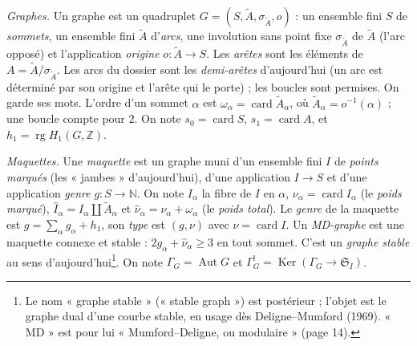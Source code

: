 \documentclass[11pt,a4paper]{article}
\begin{document}
\emph{Graphes.} Un graphe est un quadruplet $G = (S, \widetilde{A},
\sigma_{\widetilde{A}}, o)$ : un ensemble fini $S$ de \emph{sommets}, un ensemble
fini $\widetilde{A}$ d'\emph{arcs}, une involution sans point fixe
$\sigma_{\widetilde{A}}$ de $\widetilde{A}$ (l'arc opposé) et l'application
\emph{origine} $o : \widetilde{A} \to S$. Les \emph{arêtes} sont les éléments de
$A = \widetilde{A}/\sigma_{\widetilde{A}}$. Les arcs du dossier sont les
\emph{demi-arêtes} d'aujourd'hui (un arc est déterminé par son origine et
l'arête qui le porte) ; les boucles sont permises. On garde ses mots. L'ordre
d'un sommet $\alpha$ est $\omega_\alpha = \operatorname{card}
\widetilde{A}_\alpha$, où $\widetilde{A}_\alpha = o^{-1}(\alpha)$ ; une boucle
compte pour $2$. On note $s_0 = \operatorname{card} S$, $s_1 =
\operatorname{card} A$, et $h_1 = \operatorname{rg} H_1(G, \mathbb{Z})$.

\emph{Maquettes.} Une \emph{maquette} est un graphe muni d'un ensemble fini $I$ de
\emph{points marqués} (les « jambes » d'aujourd'hui), d'une application $I \to S$
et d'une application \emph{genre} $g : S \to \mathbb{N}$. On note $I_\alpha$ la
fibre de $I$ en $\alpha$, $\nu_\alpha = \operatorname{card} I_\alpha$ (le
\emph{poids marqué}), $\widehat{I}_\alpha = I_\alpha \amalg
\widetilde{A}_\alpha$ et $\widehat{\nu}_\alpha = \nu_\alpha + \omega_\alpha$ (le
\emph{poids total}). Le \emph{genre} de la maquette est $g = \sum_\alpha g_\alpha
+ h_1$, son \emph{type} est $(g, \nu)$ avec $\nu = \operatorname{card} I$. Un
\emph{MD-graphe} est une maquette connexe et stable : $2g_\alpha +
\widehat{\nu}_\alpha \geq 3$ en tout sommet. C'est un \emph{graphe stable} au
sens d'aujourd'hui\footnote{Le nom « graphe stable » (« stable graph ») est
postérieur ; l'objet est le graphe dual d'une courbe stable, en usage dès
Deligne--Mumford (1969). « MD » est pour lui « Mumford--Deligne, ou
modulaire » (page 14).}. On note $\Gamma_G = \operatorname{Aut} G$ et
$\Gamma^{!}_G = \operatorname{Ker}(\Gamma_G \to \mathfrak{S}_I)$.
\end{document}
